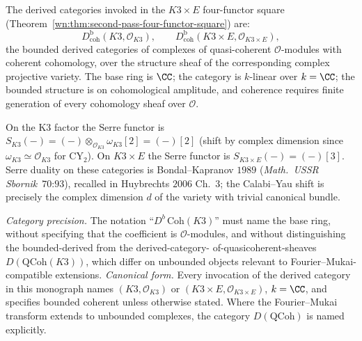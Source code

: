 \begin{theorem}
\label{wn:thm:third-pass-derived-base}

The derived categories invoked in the $K3 \times E$ four-functor
square (Theorem~\ref{wn:thm:second-pass-four-functor-square}) are:
\[
D^{\mathrm{b}}_{\mathrm{coh}}(K3, \mathcal{O}_{K3}),
\qquad
D^{\mathrm{b}}_{\mathrm{coh}}(K3 \times E, \mathcal{O}_{K3\times E}),
\]
the bounded derived categories of complexes of quasi-coherent
$\mathcal{O}$-modules with coherent cohomology, over the structure
sheaf of the corresponding complex projective variety. The base ring
is $\CC$; the category is $k$-linear over $k = \CC$; the bounded
structure is on cohomological amplitude, and coherence requires
finite generation of every cohomology sheaf over $\mathcal{O}$.

On the K3 factor the Serre functor is
$S_{K3}(-) = (-)\otimes_{\mathcal{O}_{K3}} \omega_{K3}[2] = (-)[2]$
(shift by complex dimension since $\omega_{K3} \simeq \mathcal{O}_{K3}$
for CY$_2$). On $K3\times E$ the Serre functor is
$S_{K3\times E}(-) = (-)[3]$. Serre duality on these categories is
Bondal--Kapranov $1989$ (\emph{Math.~USSR Sbornik}~$70$:$93$),
recalled in Huybrechts $2006$ Ch.~$3$; the Calabi--Yau shift is
precisely the complex dimension $d$ of the variety with trivial
canonical bundle.

\emph{Category precision.} The notation ``$D^b\,\mathrm{Coh}(K3)$''
must name the base ring,
without specifying that the coefficient is $\mathcal{O}$-modules, and
without distinguishing the bounded-derived from the derived-category-
of-quasicoherent-sheaves $D(\mathrm{QCoh}(K3))$, which differ on
unbounded objects relevant to Fourier--Mukai-compatible extensions.
\emph{Canonical form.} Every invocation of the derived category in this
monograph names $(K3, \mathcal{O}_{K3})$ or
$(K3 \times E, \mathcal{O}_{K3\times E})$, $k = \CC$, and specifies
bounded coherent unless otherwise stated. Where the Fourier--Mukai
transform extends to unbounded complexes, the category
$D(\mathrm{QCoh})$ is named explicitly.
\end{theorem}

